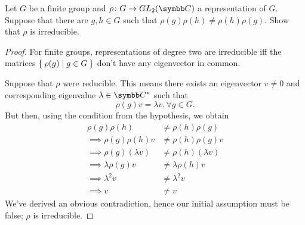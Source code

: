 \begin{exercise}
Let \(G\) be a finite group and \(\rho \colon G \to GL_2(\complex)\) a representation of \(G\). Suppose that there are \(g, h \in G\) such that \(\rho(g) \rho(h) \neq \rho(h) \rho(g)\). Show that \(\rho\) is irreducible.
\end{exercise}
\begin{proof}
For finite groups, representations of degree two are irreducible iff the matrices \(\Set{ \rho(g) | g \in G }\) don't have any eigenvector in common.

Suppose that \(\rho\) were reducible. This means there exists an eigenvector \(v \neq 0\) and corresponding eigenvalue \(\lambda \in \complex^*\) such that
\[
    \rho(g) v = \lambda v, \forall g \in G.
\]
But then, using the condition from the hypothesis, we obtain
\begin{align*}
    \rho(g) \rho(h) &\neq \rho(h) \rho(g) \\
    \implies
    \rho(g) \rho(h) v &\neq \rho(h) \rho(g) v 
    \tag{\(v\) is non-zero} \\
    \implies
    \rho(g) (\lambda v) &\neq \rho(h) (\lambda v)
    \tag{\(v\) is an eigenvector} \\
    \implies
    \lambda \rho(g) v &\neq \lambda \rho(h) v 
    \tag{multiplication by scalar is commutative} \\
    \implies
    \lambda^2 v &\neq \lambda^2 v
    \tag{\(v\) is an eigenvector} \\
    \implies v &\neq v
    \tag{\(\lambda\) is non-zero}
\end{align*}
We've derived an obvious contradiction, hence our initial assumption must be false; \(\rho\) is irreducible. 
\end{proof}

